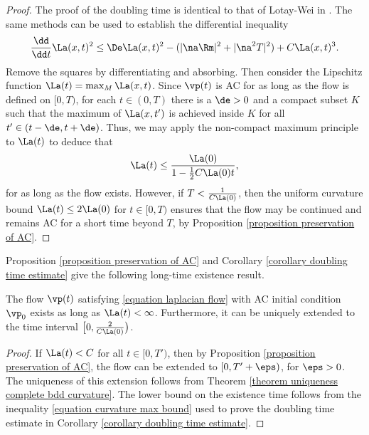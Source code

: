 \documentclass[hidelinks, 12pt, oneside, reqno]{amsart}
\begin{document}
\begin{proof}
    The proof of the doubling time is identical to that of Lotay-Wei in \cite[Proposition 4.1]{LotayWeiLaplacianFlow}. The same methods can be used to establish the differential inequality 
    \[
    \frac{\dd}{\dd t} \La(x,t)^2 \le \De \La (x,t)^2 - (|\na \Rm|^2 + |\na^2 T|^2) + C\La(x,t)^3. 
    \]
    Remove the squares by differentiating and absorbing. Then consider the Lipschitz function $\La(t) = \max_M \La(x,t)$. Since $\vp(t)$ is AC for as long as the flow is defined on $[0,T)$, for each $t \in (0,T)$ there is a $\de >0$ and a compact subset $K$ such that the maximum of $\La(x,t')$ is achieved inside $K$ for all $t' \in (t-\de, t+\de)$. Thus, we may apply the non-compact maximum principle \cite[Theorem 2.1.1]{Mantegazza} to $\La(t)$ to deduce that
    \begin{equation}\label{equation curvature max bound}
    \La(t) \le \frac{\La(0)}{1- \tfrac12 C \La(0)t},
    \end{equation}
    for as long as the flow exists. However, if $T < \tfrac{1}{C\La(0)}$, then the uniform curvature bound $\La(t) \le 2\La(0)$ for $t \in [0,T)$ ensures that the flow may be continued and remains AC for a short time beyond $T$, by Proposition \ref{proposition preservation of AC}. 
\end{proof}

Proposition \ref{proposition preservation of AC} and Corollary \ref{corollary doubling time estimate} give the following long-time existence result. 

\begin{cor}\label{corollary existence time lower bound}
    The flow $\vp(t)$ satisfying \eqref{equation laplacian flow} with AC initial condition $\vp_0$ exists as long as $\La(t) < \infty$. Furthermore, it can be uniquely extended to the time interval $\big[0, \tfrac{2}{C\La(0)}\big)$. 
\end{cor}

\begin{proof}
    If $\La(t) < C$ for all $t \in [0,T')$, then by Proposition \ref{proposition preservation of AC}, the flow can be extended to $[0,T'+\eps)$, for $\eps >0$. The uniqueness of this extension follows from Theorem \ref{theorem uniqueness complete bdd curvature}. The lower bound on the existence time follows from the inequality \eqref{equation curvature max bound} used to prove the doubling time estimate in Corollary \ref{corollary doubling time estimate}.
\end{proof}
\end{document}
